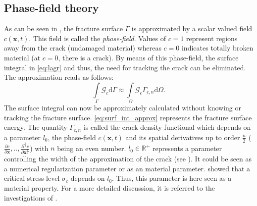 \subsection{Phase-field theory} \label{sec:ph_approx}
As can be seen in , the fracture surface $\Gamma$ is approximated by a scalar valued field $c\left(\mathbf{x},t\right)$. This field is called the  \textit{phase-field}. Values of $c=1$ represent regions away from the crack (undamaged material) whereas $c=0$ indicates totally broken material (at $c=0$, there is a crack). By means of this phase-field, the surface integral in \eqref{eq:lagr} and thus, the need for tracking the crack can be eliminated. The approximation reads as follows:
\begin{equation} \label{eq:surf_int_approx}
	\int\limits_{\Gamma}\mathcal{G}_{c}\mathrm{d}\Gamma \approx \int\limits_{\Omega}\mathcal{G}_{c}\Gamma_{c,n}\mathrm{d}\Omega.
\end{equation}
The surface integral can now be approximately calculated without knowing or tracking the fracture surface. \eqref{eq:surf_int_approx} represents the fracture surface energy. The quantity $\Gamma_{c,n}$ is called the crack density functional which depends on a parameter $l_{0}$, the phase-field $c\left(\mathbf{x},t\right)$ and its spatial derivatives up to order $\frac{n}{2}$ ($\frac{\partial c}{\partial \mathbf{x}},..,\frac{\partial^{\frac{n}{2}} c}{\partial \mathbf{x}^{\frac{n}{2}}}$) with $n$ being an even number. $l_{0}\in\mathbb{R}^{+}$ represents a parameter controlling the width of the approximation of the crack (see ). It could be seen as a numerical regularization parameter or as an material parameter. \citet{01_PF_dyn_brittle} showed that a critical stress level $\sigma_{c}$ depends on $l_{0}$. Thus, this parameter is here seen as a material property. For a more detailed discussion, it is referred to the investigations of \citet{07_PF_l0}.

